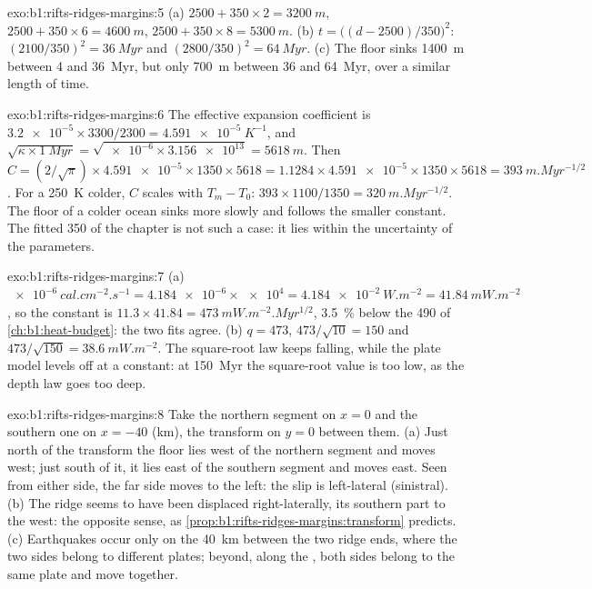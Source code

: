\begin{solution}{exo:b1:rifts-ridges-margins:5}
(a) $2500 + 350\times2 = \qty{3200}{m}$, $2500 + 350\times6 = \qty{4600}{m}$,
$2500 + 350\times8 = \qty{5300}{m}$. (b) $t = \bigl((d - 2500)/350\bigr)^2$:
$(2100/350)^2 = \qty{36}{Myr}$ and $(2800/350)^2 = \qty{64}{Myr}$. (c) The
floor sinks \qty{1400}{m} between 4 and \qty{36}{Myr}, but only \qty{700}{m}
between 36 and \qty{64}{Myr}, over a similar length of time.
\end{solution}

\begin{solution}{exo:b1:rifts-ridges-margins:6}
The effective expansion coefficient is
$\num{3.2e-5}\times3300/2300 = \qty{4.591e-5}{K^{-1}}$, and
$\sqrt{\kappa\times\qty{1}{Myr}} = \sqrt{\num{e-6}\times\num{3.156e13}} =
\qty{5618}{m}$. Then $C = (2/\sqrt\pi)\times\num{4.591e-5}\times1350\times5618 =
1.1284\times\num{4.591e-5}\times1350\times5618 = \qty{393}{m.Myr^{-1/2}}$. For a
 \qty{250}{K} colder, $C$ scales with $T_m - T_0$:
$393\times1100/1350 = \qty{320}{m.Myr^{-1/2}}$. The floor of a colder ocean
sinks more slowly and follows the smaller constant. The fitted \num{350} of the
chapter is not such a case: it lies within the uncertainty of the parameters.
\end{solution}

\begin{solution}{exo:b1:rifts-ridges-margins:7}
(a) $\qty{e-6}{cal.cm^{-2}.s^{-1}} = \num{4.184e-6}\times\num{e4} =
\qty{4.184e-2}{W.m^{-2}} = \qty{41.84}{mW.m^{-2}}$, so the constant is
$11.3\times41.84 = \qty{473}{mW.m^{-2}.Myr^{1/2}}$, \qty{3.5}{\percent} below
the 490 of \cref{ch:b1:heat-budget}: the two fits agree. (b) $q = 473$,
$473/\sqrt{10} = 150$ and $473/\sqrt{150} = \qty{38.6}{mW.m^{-2}}$. The
square-root law keeps falling, while the plate model levels off at a constant:
at \qty{150}{Myr} the square-root value is too low, as the depth law goes too
deep.
\end{solution}

\begin{solution}{exo:b1:rifts-ridges-margins:8}
Take the northern segment on $x = 0$ and the southern one on $x = -40$
(km), the transform on $y = 0$ between them. (a) Just north of the transform the
floor lies west of the northern segment and moves west; just south of it, it
lies east of the southern segment and moves east. Seen from either side, the
far side moves to the left: the slip is left-lateral (sinistral). (b) The
ridge seems to have been displaced right-laterally, its southern part to the
west: the opposite sense, as \cref{prop:b1:rifts-ridges-margins:transform}
predicts. (c) Earthquakes occur only on the \qty{40}{km} between the two ridge
ends, where the two sides belong to different plates; beyond, along the
, both sides belong to the same plate and move together.
\end{solution}

